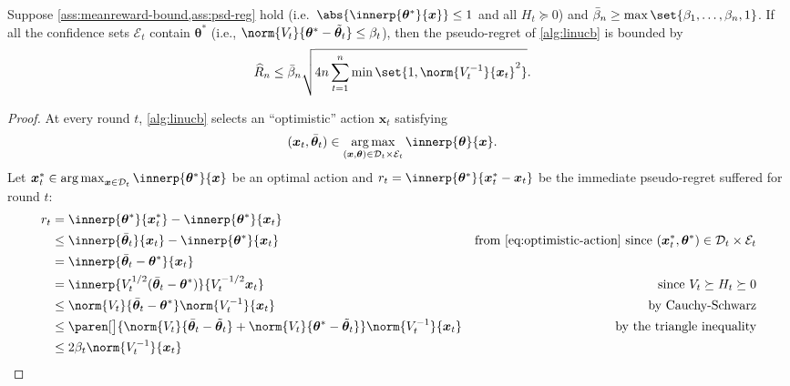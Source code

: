 \documentclass{article}
\renewcommand{\vec}[1]{\bm{#1}}
\newcommand{\inv}[1]{#1^{-1}}
\newcommand{\argmax}{\operatorname*{arg\,max}}
\DeclarePairedDelimiter{\abs}||
\DeclarePairedDelimiter{\paren}()
\newcommand{\Dset}[1]{\mathcal{D}_{#1}}
\newcommand{\Eset}[1]{\mathcal{E}_{#1}}
\begin{document}
\begin{lemma}\label{lemma:linucb-regret}
  Suppose \cref{ass:meanreward-bound,ass:psd-reg} hold (i.e.\
  $\abs{\innerp{\vec\theta^*}{\vec x}} \le 1$ and all $H_t \succeq 0$)
  and $\bar\beta_n \ge \max\set{\beta_1,\dotsc,\beta_n,1}$.  If all
  the confidence sets $\Eset{t}$ contain $\vec\theta^*$ (i.e.,
  $\norm{V_t}{\vec\theta^* - \tilde{\vec\theta}_t} \le
  \beta_t$), then the pseudo-regret of \cref{alg:linucb} is bounded by
  \begin{align*}
    \widehat{R}_n &\le \bar\beta_n\sqrt{4n \sum_{t=1}^n \min\set{1,
                   \norm{\inv{V_t}}{\vec x_t}^2}}.
  \end{align*}
\end{lemma}

\begin{proof}
  At every round $t$, \cref{alg:linucb} selects an ``optimistic''
  action $\vec x_t$ satisfying
  \begin{align}\label{eq:optimistic-action}
    (\vec x_t,\bar{\vec\theta}_t)
    &\in \argmax_{(\vec x, \vec\theta) \in\Dset{t}\times\Eset{t}} \innerp{\vec\theta}{\vec x}.
  \end{align}
  Let $\vec x_t^* \in \argmax_{\vec x\in\Dset{t}}\innerp{\vec\theta^*}{\vec x}$ be an optimal
  action and $r_t = \innerp{\vec\theta^*}{\vec x_t^* - \vec x_t}$ be the immediate
  pseudo-regret suffered for round $t$:
  \begin{align*}
    r_t &= \innerp{\vec\theta^*}{\vec x_t^*} - \innerp{\vec\theta^*}{\vec x_t} \\
        &\le \innerp{\bar{\vec\theta}_t}{\vec x_t} - \innerp{\vec\theta^*}{\vec x_t}
        &\text{from \eqref{eq:optimistic-action} since }
          (\vec x_t^*,\vec\theta^*) \in \Dset{t}\times\Eset{t} \\
        &= \innerp{\bar{\vec\theta}_t - \vec\theta^*}{\vec x_t} \\
       &= \innerp{V_t^{1/2}(\bar{\vec\theta}_t - \vec\theta^*)}{V_t^{-1/2} \vec x_t}
        &\text{since } V_t \succeq H_t \succeq 0 \\
        &\le \norm{V_t}{\bar{\vec\theta}_t - \vec\theta^*}\norm{\inv{V_t}}{\vec x_t}
        &\text{by Cauchy-Schwarz}\\
        &\le \paren[\big]{\norm{V_t}{\bar{\vec\theta}_t - \tilde{\vec\theta}_t}
          + \norm{V_t}{\vec\theta^* - \tilde{\vec\theta}_t}}
          \norm{\inv{V_t}}{\vec x_t}
        &\text{by the triangle inequality}\\
        &\le 2\beta_t\norm{\inv{V_t}}{\vec x_t}

\end{align*}
\end{proof}
\end{document}
